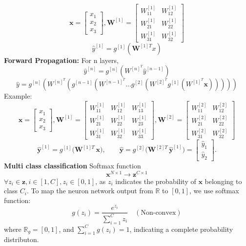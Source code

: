 \documentclass[8pt,twocolumn]{article}
\begin{document}
\[\textbf{x} = \begin{bmatrix}
    x_1 \\ x_2\\x_3
    \end{bmatrix}, \textbf{W}^{[1]} = \begin{bmatrix}
        W^{[1]}_{11} & W^{[1]}_{12} \\ W^{[1]}_{21} & W^{[1]}_{22}\\ W^{[1]}_{31} & W^{[1]}_{32} 
        \end{bmatrix}\]
        \[\hat{y}^{[1]} = g^{[1]}(\textbf{W}^{[1]T}x)\]
\textbf{Forward Propagation:} For n layers, 
\[\hat{y}^{[n]} = g^{[n]}(W^{[n]^T}\hat{y}^{[n-1]})\]
\[\hat{y} = g^{[n]}(W^{[n]^T}(g^{[n-1]}(W^{[n-1]^T}... g^{[2]}(W^{[2]^T} g^{[1]}(W^{[1]^T}\textbf{x})))))\]
Example:
\[
\mathbf{x} = \begin{bmatrix}
  x_1 \\ x_2 \\ x_3
\end{bmatrix}, 
\mathbf{W}^{[1]} = \begin{bmatrix}
  W^{[1]}_{11} & W^{[1]}_{12} & W^{[1]}_{13} \\
  W^{[1]}_{21} & W^{[1]}_{22} & W^{[1]}_{23} \\
  W^{[1]}_{31} & W^{[1]}_{32} & W^{[1]}_{33}
\end{bmatrix}, 
\mathbf{W}^{[2]} = \begin{bmatrix}
  W^{[2]}_{11} & W^{[2]}_{12} \\
  W^{[2]}_{21} & W^{[2]}_{22} \\
  W^{[2]}_{31} & W^{[2]}_{32}
\end{bmatrix}
\]
\[
\hat{\mathbf{y}}^{[1]}
= g^{[1]}\bigl(\mathbf{W}^{[1]\!T}\,\mathbf{x}\bigr),
\qquad
\hat{\mathbf{y}}
= g^{[2]}\bigl(\mathbf{W}^{[2]\!T}\,\hat{\mathbf{y}}^{[1]}\bigr)
= \begin{bmatrix} \hat y_1 \\ \hat y_2 \end{bmatrix}.
\]
\textbf{Multi class classification}
Softmax function
\[\textbf{x}^{N\times 1} \rightarrow \textbf{z}^{C \times 1}\]
$\forall z_i \in \textbf{z}, i \in [1, C], z_i \in [0, 1]$, as $z_i$ indicates the probability of $\textbf{x}$ belonging to class $C_i$. 
To map the neuron network output from $\mathbb{R}$ to $[0, 1]$, we use softmax function: 
\[g(z_i) = \frac{e^{z_i}}{\sum_{i=1}^{C} z_i} \quad (\text{Non-convex})\]
where $\mathbb{R}_g = [0, 1]$, and $\sum_{i=1}^{C} g(z_i) = 1$, indicating a complete probability distributon.\\
\end{document}
